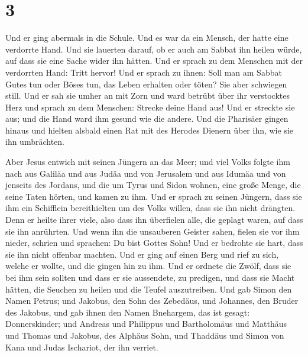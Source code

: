 \hypertarget{section-2}{%
\section{3}\label{section-2}}

 Und er ging abermals in die Schule. Und es war da ein
Mensch, der hatte eine verdorrte Hand.  Und sie lauerten
darauf, ob er auch am Sabbat ihn heilen würde, auf dass sie eine Sache
wider ihn hätten.  Und er sprach zu dem Menschen mit der
verdorrten Hand: Tritt hervor!  Und er sprach zu ihnen:
Soll man am Sabbat Gutes tun oder Böses tun, das Leben erhalten oder
töten? Sie aber schwiegen still.  Und er sah sie umher an
mit Zorn und ward betrübt über ihr verstocktes Herz und sprach zu dem
Menschen: Strecke deine Hand aus! Und er streckte sie aus; und die Hand
ward ihm gesund wie die andere.  Und die Pharisäer gingen
hinaus und hielten alsbald einen Rat mit des Herodes Dienern über ihn,
wie sie ihn umbrächten.

 Aber Jesus entwich mit seinen Jüngern an das Meer; und
viel Volks folgte ihm nach aus Galiläa und aus Judäa  und
von Jerusalem und aus Idumäa und von jenseits des Jordans, und die um
Tyrus und Sidon wohnen, eine große Menge, die seine Taten hörten, und
kamen zu ihm.  Und er sprach zu seinen Jüngern, dass sie
ihm ein Schifflein bereithielten um des Volks willen, dass sie ihn nicht
drängten.  Denn er heilte ihrer viele, also dass ihn
überfielen alle, die geplagt waren, auf dass sie ihn anrührten.
 Und wenn ihn die unsauberen Geister sahen, fielen sie
vor ihm nieder, schrien und sprachen: Du bist Gottes Sohn!
 Und er bedrohte sie hart, dass sie ihn nicht offenbar
machten.  Und er ging auf einen Berg und rief zu sich,
welche er wollte, und die gingen hin zu ihm.  Und er
ordnete die Zwölf, dass sie bei ihm sein sollten und dass er sie
aussendete, zu predigen,  und dass sie Macht hätten, die
Seuchen zu heilen und die Teufel auszutreiben.  Und gab
Simon den Namen Petrus;  und Jakobus, den Sohn des
Zebedäus, und Johannes, den Bruder des Jakobus, und gab ihnen den Namen
Bnehargem, das ist gesagt: Donnerskinder;  und Andreas
und Philippus und Bartholomäus und Matthäus und Thomas und Jakobus, des
Alphäus Sohn, und Thaddäus und Simon von Kana  und Judas
Ischariot, der ihn verriet.


